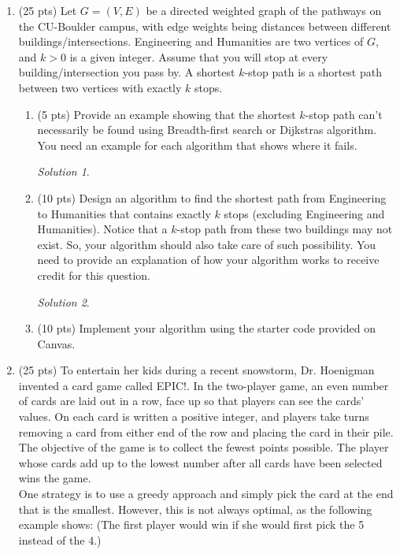 \documentclass[12pt]{article}
\theoremstyle{remark}
\newtheorem*{solution}{Solution}
\begin{document}
\begin{enumerate}
\item (25 pts) Let $G=(V,E)$ be a directed weighted graph of the pathways on the CU-Boulder campus, with edge weights being distances between different buildings/intersections. Engineering and Humanities are two vertices of $G$, and $k>0$ is a given integer. Assume that you will stop at every building/intersection you pass by. A shortest $k$-stop path is a shortest path between two vertices with exactly $k$ stops.
\begin{enumerate}
    \item (5 pts) Provide an example showing that the shortest $k$-stop path can't necessarily be found using Breadth-first search or Dijkstras algorithm. You need an example for each algorithm that shows where it fails.
    \begin{solution}
    
    \end{solution}
    \pagebreak

    \item (10 pts) Design an algorithm to find the shortest path from Engineering to Humanities that contains exactly $k$ stops (excluding Engineering and Humanities). Notice that a $k$-stop path from these two buildings may not exist. So, your algorithm should also take care of such possibility. You need to provide an explanation of how your algorithm works to receive credit for this question.
    \begin{solution}
    
    \end{solution}
    \pagebreak

    \item (10 pts) Implement your algorithm using the starter code provided on Canvas. 
    
\end{enumerate}

\item (25 pts) To entertain her kids during a recent snowstorm, Dr. Hoenigman invented a card game called EPIC!. In the two-player game, an even number of cards are laid out in a row, face up so that players can see the cards' values. On each card is written a positive integer, and players take turns removing a card from either end of the row and placing the card in their pile. The objective of the game is to collect the fewest points possible. The player whose cards add up to the lowest number after all cards have been selected wins the game.
\\One strategy is to use a greedy approach and simply pick the card at the end that is the smallest. However, this is not always optimal, as the following example shows: (The first player would win if she would first pick the 5 instead of the 4.)


\end{enumerate}
\end{document}
